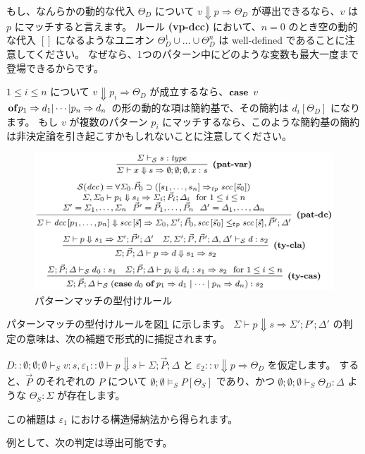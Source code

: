 \documentclass[submit,techreq,noauthor,onecolumn]{ipsj}
\begin{document}
\noindent もし、なんらかの動的な代入 $\Theta_D$ について $v \Downarrow p \Rightarrow \Theta_D$ が導出できるなら、$v$ は $p$ にマッチすると言えます。
ルール {\bf (vp-dcc)} において、$n = 0$ のとき空の動的な代入 $[]$ になるようなユニオン $\Theta^1_D \cup \ldots \cup \Theta^n_D$ は well-defined であることに注意してください。
なぜなら、1つのパターン中にどのような変数も最大一度まで登場できるからです。

$1 \leq i \leq n$ について $v \Downarrow p_i \Rightarrow \Theta_D$ が成立するなら、${\bf case}$ $v$ ${\bf of} p_1 \Rightarrow d_1 |\cdots| p_n \Rightarrow d_n$ の形の動的な項は簡約基で、その簡約は $d_i[\Theta_D]$ になります。
もし $v$ が複数のパターン $p_i$ にマッチするなら、このような簡約基の簡約は非決定論を引き起こすかもしれないことに注意してください。

\begin{figure}[h]
\centering
\includegraphics[width=12cm]{img/fig6_rules_pattern_match.png}
\caption{パターンマッチの型付けルール}
\label{fig:fig6_rules_pattern_match}
\end{figure}

パターンマッチの型付けルールを図\ref{fig:fig6_rules_pattern_match} に示します。
$\Sigma \vdash p \Downarrow s \Rightarrow \Sigma'; P'; \Delta'$ の判定の意味は、次の補題で形式的に捕捉されます。

$D :: \emptyset;\emptyset;\emptyset \vdash_S v:s, \varepsilon_1::\emptyset \vdash p \Downarrow s \vdash \Sigma; \vec{P}; \Delta$ と $\varepsilon_2 :: v \Downarrow p \Rightarrow \Theta_D$ を仮定します。
すると、$\vec{P}$ のそれぞれの $P$ について $\emptyset;\emptyset \models_S P[\Theta_S]$ であり、かつ $\emptyset;\emptyset;\emptyset \vdash_S \Theta_D : \Delta$ ような $\Theta_S : \Sigma$ が存在します。

この補題は $\varepsilon_1$ における構造帰納法から得られます。

\noindent 例として、次の判定は導出可能です。
\end{document}
